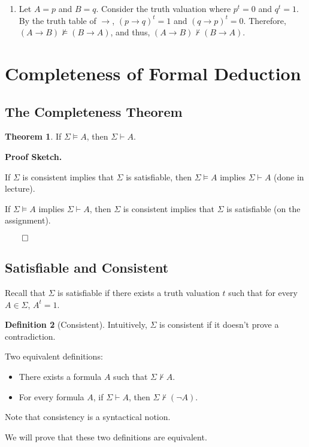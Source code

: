 \documentclass[11pt]{article}
\makeatletter
\theoremstyle{definition}
\newtheorem{thm}{Theorem}[section]
\newtheorem{defn}[thm]{Definition}
\newenvironment{pf}[1][\proofname]{\par
  \pushQED{\qed}%
  \normalfont \topsep0\p@\relax
  \trivlist
  \item[\hskip\labelsep\itshape
  #1\@addpunct{.}]\ignorespaces
}{%
  \popQED\endtrivlist\@endpefalse
}
\makeatother
\begin{document}
\begin{enumerate}
\begin{pf}
Let $A = p$ and $B = q$. Consider the truth valuation where $p^t = 0$ and $q^t = 1$. By the truth table of $\rightarrow$, $(p \rightarrow q)^t = 1$ and $(q \rightarrow p)^t = 0$. Therefore, $(A \rightarrow B) \nvDash (B \rightarrow A)$, and thus, $(A \rightarrow B) \nvdash (B \rightarrow A)$.
\end{pf}

\end{enumerate}

\newpage
\section{Completeness of Formal Deduction}

\subsection{The Completeness Theorem}
\begin{thm}
If $\Sigma \vDash A$, then $\Sigma \vdash A$.

{\bf Proof Sketch.}

If $\Sigma$ is consistent implies that $\Sigma$ is satisfiable, then $\Sigma \vDash A$ implies $\Sigma \vdash A$ (done in lecture). 

If $\Sigma \vDash A$ implies $\Sigma \vdash A$, then $\Sigma$ is consistent implies that $\Sigma$ is satisfiable (on the assignment). 
\vspace{-1cm}
\begin{flushright} $\qed$ \end{flushright}
\end{thm}
\vspace{-0.25cm}

\subsection{Satisfiable and Consistent}
Recall that $\Sigma$ is satisfiable if there exists a truth valuation $t$ such that for every $A \in \Sigma$, $A^t = 1$.

\begin{defn}[Consistent]
Intuitively, $\Sigma$ is consistent if it doesn't prove a contradiction.

Two equivalent definitions: \vspace{-0.25cm}
\begin{itemize}
    \item There exists a formula $A$ such that $\Sigma \nvdash A$.
    \item For every formula $A$, if $\Sigma \vdash A$, then $\Sigma \nvdash (\neg A)$.
\end{itemize}
\vspace{-0.25cm}
Note that consistency is a syntactical notion.
\end{defn}
\vspace{-.25cm}
We will prove that these two definitions are equivalent.
\end{document}
